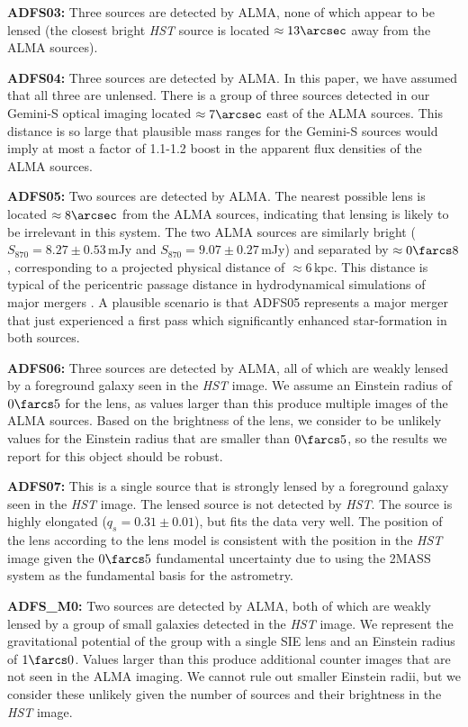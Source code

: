\documentclass[iop]{emulateapj}
\begin{document}
{\bf ADFS03:} Three sources are detected by ALMA, none of which appear to be
lensed (the closest bright {\it HST} source is located $\approx 13\arcsec$ away
from the ALMA sources).

{\bf ADFS04:} Three sources are detected by ALMA.  In this paper, we have
assumed that all three are unlensed.  There is a group of three sources
detected in our Gemini-S optical imaging located $\approx 7\arcsec$ east of the
ALMA sources.  This distance is so large that plausible mass ranges for the
Gemini-S sources would imply at most a factor of 1.1-1.2 boost in the apparent
flux densities of the ALMA sources.

{\bf ADFS05:} Two sources are detected by ALMA.  The nearest possible lens is
located $\approx 8\arcsec$ from the ALMA sources, indicating that lensing is
likely to be irrelevant in this system.  The two ALMA sources are similarly
bright ($S_{870} = 8.27 \pm 0.53\,$mJy and $S_{870} = 9.07 \pm 0.27\,$mJy) and
separated by $\approx 0\farcs8$, corresponding to a projected physical distance
of $\approx 6\,$kpc. This distance is typical of the pericentric passage
distance in hydrodynamical simulations of major mergers
\citep[e.g.,][]{Hayward:2012lr}.  A plausible scenario is that ADFS05
represents a major merger that just experienced a first pass which
significantly enhanced star-formation in both sources.

{\bf ADFS06:} Three sources are detected by ALMA, all of which are weakly
lensed by a foreground galaxy seen in the {\it HST} image.  We assume an
Einstein radius of $0\farcs5$ for the lens, as values larger than this produce
multiple images of the ALMA sources.  Based on the brightness of the lens, we
consider to be unlikely values for the Einstein radius that are smaller than
$0\farcs5$, so the results we report for this object should be robust.

{\bf ADFS07:} This is a single source that is strongly lensed by a foreground
galaxy seen in the {\it HST} image.  The lensed source is not detected by {\it
HST}.  The source is highly elongated ($q_s = 0.31 \pm 0.01$), but fits the
data very well.  The position of the lens according to the lens model is
consistent with the position in the {\it HST} image given the $0\farcs5$
fundamental uncertainty due to using the 2MASS system as the fundamental basis
for the astrometry.

{\bf ADFS\_M0:} Two sources are detected by ALMA, both of which are weakly
lensed by a group of small galaxies detected in the {\it HST} image.  We
represent the gravitational potential of the group with a single SIE lens and
an Einstein radius of $1\farcs0$.  Values larger than this produce additional
counter images that are not seen in the ALMA imaging.  We cannot rule out
smaller Einstein radii, but we consider these unlikely given the number of
sources and their brightness in the {\it HST} image.
\end{document}
